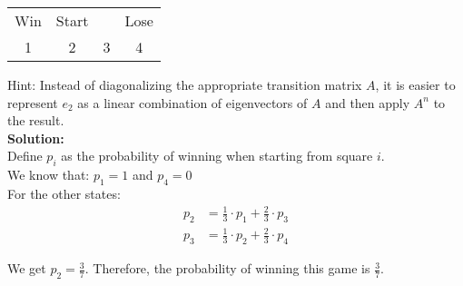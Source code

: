 \documentclass{article}
\begin{document}
\begin{center}
\begin{tabular}{|c|c|c|c|}
\hline
Win & Start & & Lose \\
1 & 2 & 3 & 4 \\
\hline
\end{tabular}
\end{center}

Hint: Instead of diagonalizing the appropriate transition matrix $A$, it is easier to represent $e_2$ as a linear combination of eigenvectors of $A$ and then apply $A^n$ to the result. \\

\textbf{Solution:} \\

Define $p_i$ as the probability of winning when starting from square $i$. \\

We know that: $p_1 = 1$ and $p_4 = 0$ \\

For the other states:
\begin{align*}
p_2 &= \frac{1}{3} \cdot p_1 + \frac{2}{3} \cdot p_3 \\
p_3 &= \frac{1}{3} \cdot p_2 + \frac{2}{3} \cdot p_4
\end{align*}

We get $p_2 = \frac{3}{7}$. Therefore, the probability of winning this game is $\frac{3}{7}$.
\end{document}
